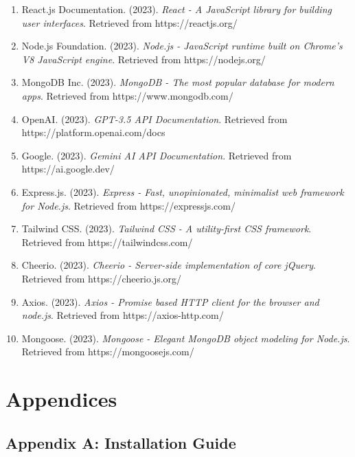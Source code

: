 \documentclass[12pt,a4paper]{article}
\begin{document}
\begin{enumerate}
    \item React.js Documentation. (2023). \textit{React - A JavaScript library for building user interfaces}. Retrieved from https://reactjs.org/
    
    \item Node.js Foundation. (2023). \textit{Node.js - JavaScript runtime built on Chrome's V8 JavaScript engine}. Retrieved from https://nodejs.org/
    
    \item MongoDB Inc. (2023). \textit{MongoDB - The most popular database for modern apps}. Retrieved from https://www.mongodb.com/
    
    \item OpenAI. (2023). \textit{GPT-3.5 API Documentation}. Retrieved from https://platform.openai.com/docs
    
    \item Google. (2023). \textit{Gemini AI API Documentation}. Retrieved from https://ai.google.dev/
    
    \item Express.js. (2023). \textit{Express - Fast, unopinionated, minimalist web framework for Node.js}. Retrieved from https://expressjs.com/
    
    \item Tailwind CSS. (2023). \textit{Tailwind CSS - A utility-first CSS framework}. Retrieved from https://tailwindcss.com/
    
    \item Cheerio. (2023). \textit{Cheerio - Server-side implementation of core jQuery}. Retrieved from https://cheerio.js.org/
    
    \item Axios. (2023). \textit{Axios - Promise based HTTP client for the browser and node.js}. Retrieved from https://axios-http.com/
    
    \item Mongoose. (2023). \textit{Mongoose - Elegant MongoDB object modeling for Node.js}. Retrieved from https://mongoosejs.com/
\end{enumerate}

\section{Appendices}

\subsection{Appendix A: Installation Guide}
\end{document}
